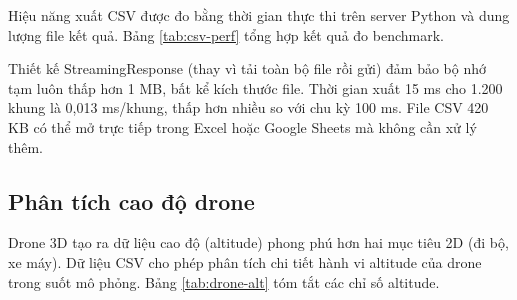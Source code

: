 \hspace{0.5cm} Hiệu năng xuất CSV được đo bằng thời gian thực thi trên server Python và dung lượng file kết quả. Bảng \ref{tab:csv-perf} tổng hợp kết quả đo benchmark.



\begin{table}[H]
\centering
{}
\caption{Hiệu năng xuất dữ liệu CSV}
\label{tab:csv-perf}
\end{table}

Thiết kế StreamingResponse (thay vì tải toàn bộ file rồi gửi) đảm bảo bộ nhớ tạm luôn thấp hơn 1 MB, bất kể kích thước file. Thời gian xuất 15 ms cho 1.200 khung là 0,013 ms/khung, thấp hơn nhiều so với chu kỳ 100 ms. File CSV 420 KB có thể mở trực tiếp trong Excel hoặc Google Sheets mà không cần xử lý thêm.

\subsection{Phân tích cao độ drone}

\hspace{0.5cm} Drone 3D tạo ra dữ liệu cao độ (altitude) phong phú hơn hai mục tiêu 2D (đi bộ, xe máy). Dữ liệu CSV cho phép phân tích chi tiết hành vi altitude của drone trong suốt mô phỏng. Bảng \ref{tab:drone-alt} tóm tắt các chỉ số altitude.

\begin{table}[H]
\centering
{}
\caption{Chỉ số cao độ drone (seed=42, 120 giây)}
\label{tab:drone-alt}
\end{table}

